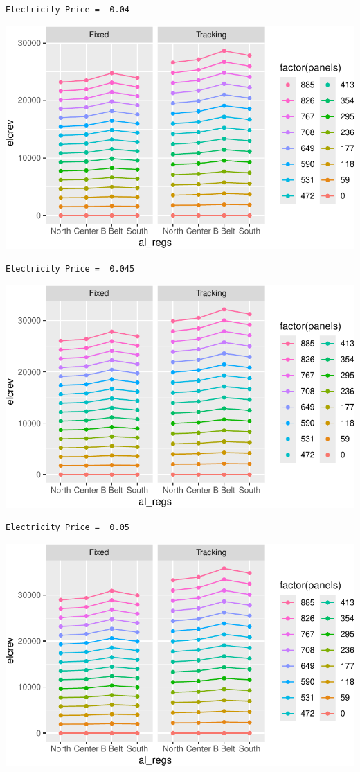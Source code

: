 \documentclass[
  letterpaper,
  DIV=11,
  numbers=noendperiod]{scrartcl}
\begin{document}
\begin{verbatim}
Electricity Price =  0.04
\end{verbatim}

\includegraphics{Simulation_files/figure-pdf/unnamed-chunk-20-7.pdf}

\begin{verbatim}
Electricity Price =  0.045
\end{verbatim}

\includegraphics{Simulation_files/figure-pdf/unnamed-chunk-20-8.pdf}

\begin{verbatim}
Electricity Price =  0.05
\end{verbatim}

\includegraphics{Simulation_files/figure-pdf/unnamed-chunk-20-9.pdf}
\end{document}

